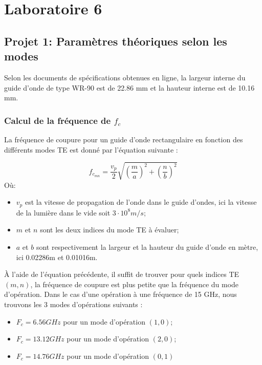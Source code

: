 



\label{s:experimentation}
\chapter{Laboratoire 6}
\section{Projet 1: Paramètres théoriques selon les modes}
Selon les documents de spécifications obtenues en ligne, la largeur interne du guide d'onde de type WR-90 est de 22.86 mm et la hauteur interne est de 10.16 mm.

\subsection{Calcul de la fréquence de $f_c$}
La fréquence de coupure pour un guide d'onde rectangulaire en fonction des différents modes TE est donné par l'équation suivante :

\begin{equation}
	f_{c_{mn}} = \frac{v_p}{2}\sqrt{\left(\frac{m}{a}\right)^2+\left(\frac{n}{b}\right)^2}
\end{equation}
Où:
\begin{itemize}
	\item $v_p$ est la vitesse de propagation de l'onde dans le guide d'ondes, ici la vitesse de la lumière dans le vide soit $3\cdot10^8m/s$;
	\item $m$ et $n$ sont les deux indices du mode TE à évaluer;
	\item $a$ et $b$ sont respectivement la largeur et la hauteur du guide d'onde en mètre, ici 0.02286m et 0.01016m.
\end{itemize}

À l'aide de l'équation précédente, il suffit de trouver pour quels indices TE $(m,n)$, la fréquence de coupure est plus petite que la fréquence du mode d'opération. Dans le cas d'une opération à une fréquence de 15 GHz, nous trouvons les 3 modes d'opérations suivants :
\begin{itemize}
	\item $F_c = 6.56 GHz$ pour un mode d'opération $(1,0)$;
	\item $F_c = 13.12 GHz$ pour un mode d'opération $(2,0)$;
	\item $F_c = 14.76 GHz$ pour un mode d'opération $(0,1)$
\end{itemize}


